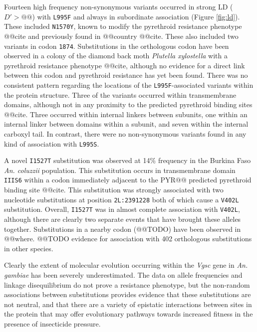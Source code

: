 \documentclass[a4paper,11pt,abstracton,hidelinks]{scrartcl}
\begin{document}
Fourteen high frequency non-synonymous variants occurred in strong LD ($D' > @@$) with \texttt{L995F} and always in subordinate association (Figure \ref{fig:ld}). 
%
These included \texttt{N1570Y}, known to modify the pyrethroid resistance phenotype @@cite and previously found in @@country @@cite.
%
These also included two variants in codon \texttt{1874}.
%
Substitutions in the orthologous codon have been observed in a colony of the diamond back moth \textit{Plutella xylostella} with a pyrethroid resistance phenotype @@cite, although no evidence for a direct link between this codon and pyrethroid resistance has yet been found.
%
There was no consistent pattern regarding the locations of the \texttt{L995F}-associated variants within the protein structure.
%
Three of the variants occurred within transmembrane domains, although not in any proximity to the predicted pyrethroid binding sites @@cite.
%
Three occurred within internal linkers between subunits, one within an internal linker between domains within a subunit, and seven within the internal carboxyl tail.
%
In contrast, there were no non-synonymous variants found in any kind of association with \texttt{L995S}.


A novel \texttt{I1527T} substitution was observed at 14\% frequency in the Burkina Faso \textit{An. coluzzii} population.
%
This substitution occurs in transmembrane domain \texttt{IIIS6} within a codon immediately adjacent to the PYR@@ predicted pyrethroid binding site @@cite.
%
This substitution was strongly associated with two nucleotide substitutions at position \texttt{2L:2391228} both of which cause a \texttt{V402L} substitution.
%
Overall, \texttt{I1527T} was in almost complete association with \texttt{V402L}, although there are clearly two separate events that have brought these alleles together.
%
Substitutions in a nearby codon (@@TODO) have been observed in @@where.
%
@@TODO evidence for association with 402 orthologous substitutions in other species.


Clearly the extent of molecular evolution occurring within the \textit{Vgsc} gene in \textit{An. gambiae} has been severely underestimated.
%
The data on allele frequencies and linkage disequilibrium do not prove a resistance phenotype, but the non-random associations between substitutions provides evidence that these substitutions are not neutral, and that there are a variety of epistatic interactions between sites in the protein that may offer evolutionary pathways towards increased fitness in the presence of insecticide pressure.
\end{document}
